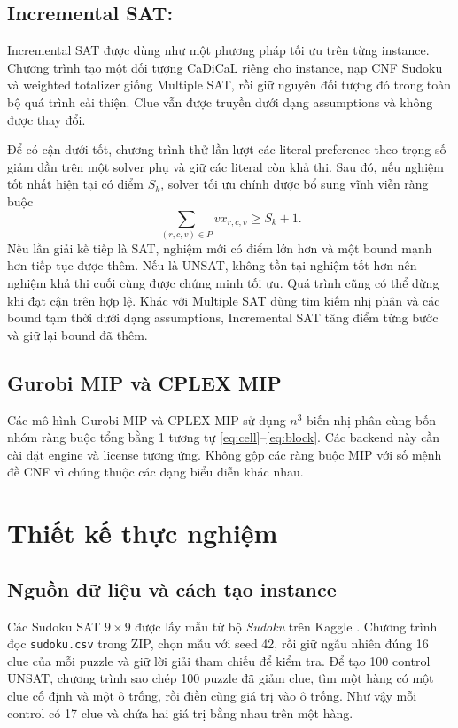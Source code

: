 \documentclass[a4paper,fleqn]{cas-sc}
\begin{document}
\subsection{Incremental SAT:}
Incremental SAT được dùng như một phương pháp tối ưu trên từng instance. Chương trình tạo một đối tượng CaDiCaL riêng cho instance, nạp CNF Sudoku và weighted totalizer giống Multiple SAT, rồi giữ nguyên đối tượng đó trong toàn bộ quá trình cải thiện. Clue vẫn được truyền dưới dạng assumptions và không được thay đổi.

Để có cận dưới tốt, chương trình thử lần lượt các literal preference theo trọng số giảm dần trên một solver phụ và giữ các literal còn khả thi. Sau đó, nếu nghiệm tốt nhất hiện tại có điểm $S_k$, solver tối ưu chính được bổ sung vĩnh viễn ràng buộc
\begin{equation}
 \sum_{(r,c,v)\in P} v x_{r,c,v}\ge S_k+1.
 \label{eq:incremental-bound}
\end{equation}
Nếu lần giải kế tiếp là SAT, nghiệm mới có điểm lớn hơn và một bound mạnh hơn tiếp tục được thêm. Nếu là UNSAT, không tồn tại nghiệm tốt hơn nên nghiệm khả thi cuối cùng được chứng minh tối ưu. Quá trình cũng có thể dừng khi đạt cận trên hợp lệ. Khác với Multiple SAT dùng tìm kiếm nhị phân và các bound tạm thời dưới dạng assumptions, Incremental SAT tăng điểm từng bước và giữ lại bound đã thêm.
\subsection{Gurobi MIP và CPLEX MIP}
Các mô hình Gurobi MIP và CPLEX MIP sử dụng $n^3$ biến nhị phân cùng bốn nhóm ràng buộc tổng bằng 1 tương tự \eqref{eq:cell}--\eqref{eq:block}. Các backend này cần cài đặt engine và license tương ứng. Không gộp các ràng buộc MIP với số mệnh đề CNF vì chúng thuộc các dạng biểu diễn khác nhau.

\section{Thiết kế thực nghiệm}\label{sec:experiment}
\subsection{Nguồn dữ liệu và cách tạo instance}
Các Sudoku SAT $9\times9$ được lấy mẫu từ bộ \emph{Sudoku} trên Kaggle \cite{kaggle_sudoku}. Chương trình đọc \texttt{sudoku.csv} trong ZIP, chọn mẫu với seed 42, rồi giữ ngẫu nhiên đúng 16 clue của mỗi puzzle và giữ lời giải tham chiếu để kiểm tra. 
Để tạo 100 control UNSAT, chương trình sao chép 100 puzzle đã giảm clue, tìm một hàng có một clue cố định và một ô trống, rồi điền cùng giá trị vào ô trống. Như vậy mỗi control có 17 clue và chứa hai giá trị bằng nhau trên một hàng.
\end{document}
